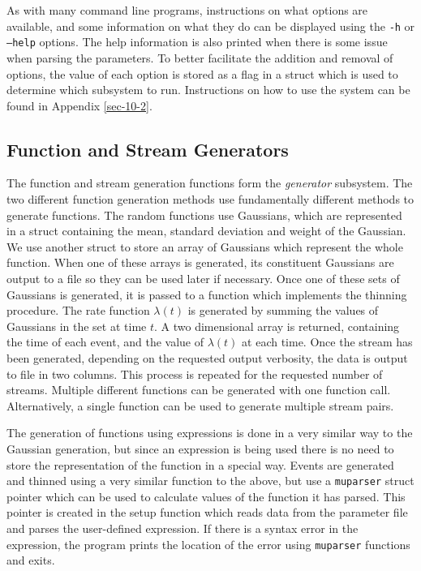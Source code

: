 \documentclass[a4paper,11pt]{article}
\begin{document}
   As with many command line programs, instructions on what options are
   available, and some information on what they do can be displayed using the
   \texttt{-h} or \texttt{--help} options. The help information is also printed
   when there is some issue when parsing the parameters. To better facilitate
   the addition and removal of options, the value of each option is stored as a
   flag in a struct which is used to determine which subsystem to
   run. Instructions on how to use the system can be found in Appendix \ref{sec-10-2}.
\subsection{Function and Stream Generators}
\label{sec-6-6}

   The function and stream generation functions form the \emph{generator}
   subsystem. The two different function generation methods use fundamentally
   different methods to generate functions. The random functions use Gaussians,
   which are represented in a struct containing the mean, standard deviation and
   weight of the Gaussian. We use another struct to store an array of Gaussians
   which represent the whole function. When one of these arrays is generated,
   its constituent Gaussians are output to a file so they can be used later if
   necessary. Once one of these sets of Gaussians is generated, it is passed to
   a function which implements the thinning procedure. The rate function
   $\lambda(t)$ is generated by summing the values of Gaussians in the set at
   time $t$. A two dimensional array is returned, containing the time of each
   event, and the value of $\lambda(t)$ at each time. Once the stream has been
   generated, depending on the requested output verbosity, the data is output to
   file in two columns. This process is repeated for the requested number of
   streams. Multiple different functions can be generated with one function
   call. Alternatively, a single function can be used to generate multiple
   stream pairs.

   The generation of functions using expressions is done in a very similar way
   to the Gaussian generation, but since an expression is being used there is no
   need to store the representation of the function in a special way. Events are
   generated and thinned using a very similar function to the above, but use a
   \texttt{muparser} struct pointer which can be used to calculate values of the
   function it has parsed. This pointer is created in the setup function which
   reads data from the parameter file and parses the user-defined expression. If
   there is a syntax error in the expression, the program prints the location of
   the error using \texttt{muparser} functions and exits.
\end{document}
